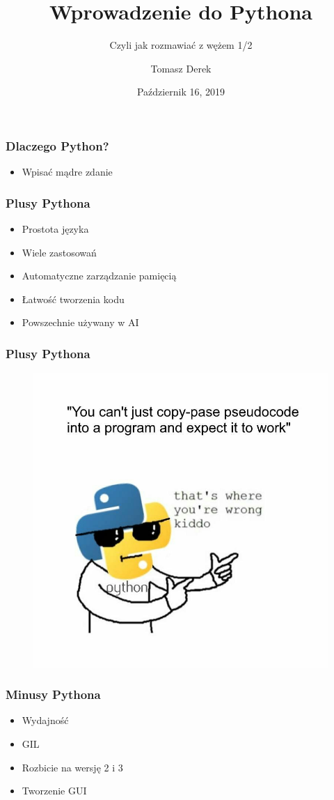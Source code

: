\documentclass[17pt]{beamer}
\title{Wprowadzenie do Pythona}
\subtitle{Czyli jak rozmawiać z wężem 1/2}
\author{Tomasz Derek}
\institute{KMS}
\date{Październik 16, 2019}
\begin{document}
 
\frame{\titlepage}
 
\begin{frame}
\frametitle{Dlaczego Python?}
\begin{itemize}
\item Wpisać mądre zdanie
\end{itemize}
\end{frame} 
 
\begin{frame}
\frametitle{Plusy Pythona}
\begin{itemize}
\item Prostota języka
\item Wiele zastosowań
\item Automatyczne zarządzanie pamięcią
\item Łatwość tworzenia kodu
\item Powszechnie używany w AI
\end{itemize}
\end{frame}

\begin{frame}
\frametitle{Plusy Pythona}
\begin{figure}[ht]
\includegraphics[scale=0.25]{./kiddo.jpeg}
\end{figure}
\end{frame}

\begin{frame}
\frametitle{Minusy Pythona}
\begin{itemize}
\item Wydajność
\item GIL
\item Rozbicie na wersję 2 i 3
\item Tworzenie GUI
\end{itemize}
\end{frame}
\end{document}

